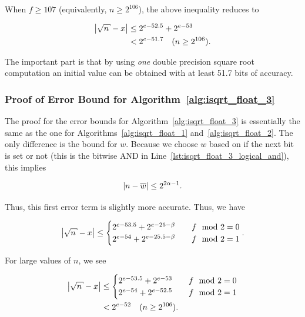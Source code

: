 \noindent
When $f\ge107$ (equivalently, $n\ge2^{106}$),
the above inequality reduces to

\begin{align}
    \abs{\sqrt{n} - x} &\le 2^{e-52.5} + 2^{e-53} \nonumber\\
        &< 2^{e-51.7} \quad (n\ge 2^{106}).
\end{align}

\noindent
The important part is that by using \emph{one} double precision
square root computation an initial value can be obtained
with at least 51.7 bits of accuracy.


\subsubsection*{Proof of Error Bound for Algorithm~\ref{alg:isqrt_float_3}}

The proof for the error bounds for Algorithm~\ref{alg:isqrt_float_3}
is essentially the same as the one for Algorithms~\ref{alg:isqrt_float_1}
and~\ref{alg:isqrt_float_2}.
The only difference is the bound for $w$.
Because we choose $w$ based on if the next bit is set or not
(this is the bitwise AND in Line~\ref{lst:isqrt_float_3_logical_and}),
this implies

\begin{equation}
    \left| n - \overline{w} \right| \le 2^{2\alpha-1}.
\end{equation}

\noindent
Thus, this first error term is slightly more accurate.
Thus, we have

\begin{equation}
    \abs{\sqrt{n} - x} \le \begin{cases}
        2^{e-53.5} + 2^{e-25-\beta}   &\quad f \mod 2 = 0 \\
        2^{e-54}   + 2^{e-25.5-\beta} &\quad f \mod 2 = 1 \\
    \end{cases}.
\end{equation}

\noindent
For large values of $n$, we see

\begin{align}
    \abs{\sqrt{n} - x} &\le \begin{cases}
        2^{e-53.5} + 2^{e-53}   &\quad f \mod 2 = 0 \\
        2^{e-54}   + 2^{e-52.5} &\quad f \mod 2 = 1 \\
    \end{cases} \nonumber\\
        &< 2^{e-52} \quad (n\ge 2^{106}).
\end{align}

